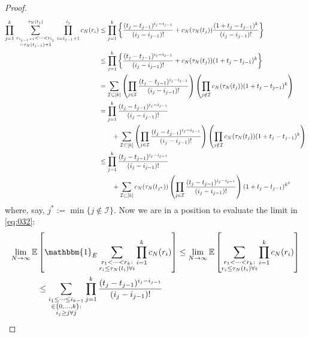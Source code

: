 \documentclass{article}
\newcommand{\E}{\mathbb{E}}
\newcommand{\1}[1]{\mathbbm{1}_{#1}}
\begin{document}
\begin{proof}
\begin{align}
\prod_{j=1}^k \,
        \sum_{\substack{ r_{i_{j-1}+1} < \dots < r_{i_j} \\ = \tau_N(t_{j-1})+1}}        
        ^{\tau_N(t_j)}  \,\prod_{i=i_{j-1}+1}^{i_j} c_N(r_i)
&\leq \prod_{j=1}^k \left\{ \frac{(t_j - t_{j-1})^{i_j - i_{j-1}}}{(i_j - i_{j-1})!}  
        + c_N(\tau_N(t_j)) \frac{(1+ t_j - t_{j-1})^k}{(i_j - i_{j-1})!} \right\} 
        \notag\\
&\leq \prod_{j=1}^k \left\{ \frac{(t_j - t_{j-1})^{i_j - i_{j-1}}}{(i_j - i_{j-1})!}  
        + c_N(\tau_N(t_j)) (1+ t_j - t_{j-1})^k \right\} \notag\\
&= \sum_{\mathcal{I} \subseteq [k]} \left( \prod_{j\in\mathcal{I}} 
        \frac{(t_j - t_{j-1})^{i_j - i_{j-1}}}{(i_j - i_{j-1})!} \right)
        \left( \prod_{j\notin\mathcal{I}} c_N(\tau_N(t_j)) 
        (1+ t_j - t_{j-1})^k \right) \notag\\
&= \prod_{j=1}^k \frac{(t_j - t_{j-1})^{i_j - i_{j-1}}}{(i_j - i_{j-1})!}  \notag\\
    &\qquad+ \sum_{\mathcal{I} \subset [k]} \left( \prod_{j\in\mathcal{I}} 
        \frac{(t_j - t_{j-1})^{i_j - i_{j-1}}}{(i_j - i_{j-1})!}\right)
        \left( \prod_{j\notin\mathcal{I}} c_N(\tau_N(t_j)) 
        (1+ t_j - t_{j-1})^k \right) \notag\\
&\leq \prod_{j=1}^k \frac{(t_j - t_{j-1})^{i_j - i_{j-1}}}{(i_j - i_{j-1})!}  \notag\\
    &\qquad+ \sum_{\mathcal{I} \subset [k]} c_N(\tau_N(t_{j^*})) 
        \left( \prod_{j\in\mathcal{I}} \frac{(t_j - t_{j-1})^{i_j - i_{j-1}}}
        {(i_j - i_{j-1})!}\right) (1+ t_j - t_{j-1})^{k^2} \label{eq:91}
\end{align}
where, say, $j^* := \min\{ j\notin\mathcal{I}\}$.
Now we are in a position to evaluate the limit in \eqref{eq:032}:
\begin{align}
\lim_{N\to\infty} \E &\left[ \1{E} 
        \sum_{\substack{r_1<\dots<r_k :\\ r_i\leq \tau_N(t_i) \forall i}} 
        \prod_{i=1}^k c_N(r_i) \right] 
\leq \lim_{N\to\infty} \E \left[\sum_{\substack{r_1<\dots<r_k :\\ 
        r_i\leq \tau_N(t_i) \forall i}} \prod_{i=1}^k c_N(r_i) \right] \notag\\
&\leq \sum_{\substack{i_1\leq \dots\leq i_{k-1}\\ \in \{0,\dots,k\} :\\ 
        i_j \geq j \forall j}} \prod_{j=1}^k \frac{(t_j - t_{j-1})^{i_j - i_{j-1}}}
        {(i_j - i_{j-1})!} \notag\\

\end{align}
\end{proof}
\end{document}
